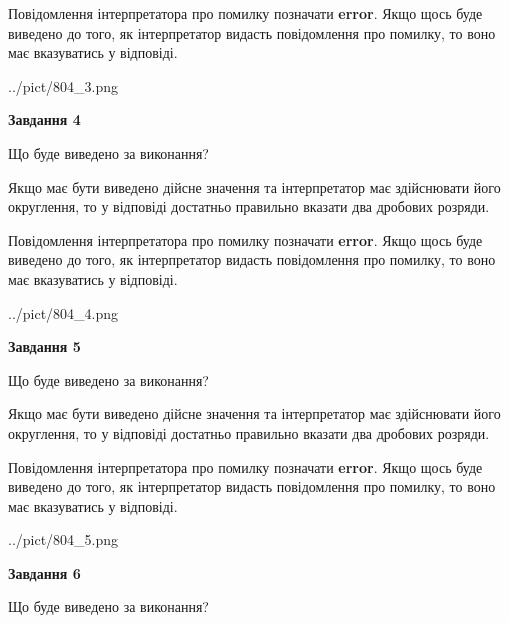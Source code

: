 \documentclass[12pt, ukrainian]{article}
\begin{document}
{\begin {Large}
Повідомлення інтерпретатора про помилку позначати \textbf{error}.
Якщо щось буде виведено до того, як інтерпретатор видасть повідомлення про помилку, 
то воно має вказуватись у відповіді. \par

\begin{center}
	{../pict/804_3.png}
\end{center}
\newpage

{\begin {center}\textbf{Завдання 4}\end {center}}\par
Що буде виведено за виконання? \par

Якщо має бути виведено дійсне значення та інтерпретатор має здійснювати його округлення, 
то у відповіді достатньо правильно вказати два дробових розряди.

Повідомлення інтерпретатора про помилку позначати \textbf{error}.
Якщо щось буде виведено до того, як інтерпретатор видасть повідомлення про помилку, 
то воно має вказуватись у відповіді. \par

\begin{center}
	{../pict/804_4.png}
\end{center}
\newpage

{\begin {center}\textbf{Завдання 5}\end {center}}\par
Що буде виведено за виконання? \par

Якщо має бути виведено дійсне значення та інтерпретатор має здійснювати його округлення, 
то у відповіді достатньо правильно вказати два дробових розряди.

Повідомлення інтерпретатора про помилку позначати \textbf{error}.
Якщо щось буде виведено до того, як інтерпретатор видасть повідомлення про помилку, 
то воно має вказуватись у відповіді. \par

\begin{center}
	{../pict/804_5.png}
\end{center}
\newpage

{\begin {center}\textbf{Завдання 6}\end {center}}\par
Що буде виведено за виконання? \par


\end{Large}}
\end{document}
